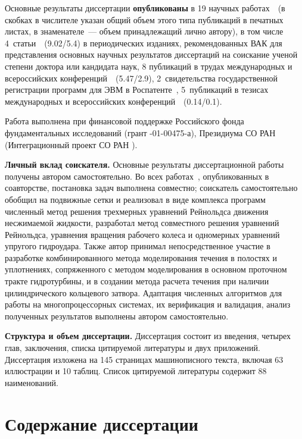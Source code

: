 Основные результаты диссертации \textbf{опубликованы} в 19 научных 
работах~\cite{my1,my1_2,my2,my3,my4,my5,my6,my7,my8,my9,my10,my11,my12,my13,my14,my15,my16,my17,my18}~(в 
скобках в числителе указан общий объем этого типа публикаций в печатных листах, в знаменателе~--- объем 
принадлежащий лично автору), в том числе  4~статьи~\cite{my1,my1_2,my2,my3}~(9.02/5.4) в 
периодических изданиях, рекомендованных ВАК для представления основных научных результатов диссертаций на 
соискание ученой степени доктора или кандидата наук, 8 публикаций в трудах международных и всероссийских
конференций~\cite{my4,my5,my6,my7,my8,my9,my10,my11}~(5.47/2.9), 2~свидетельства государственной 
регистрации программ для ЭВМ в Роспатенте~\cite{my12,my13}, 5~публикаций в тезисах международных и 
всероссийских конференций~\cite{my14,my15,my16,my17,my18}~(0.14/0.1).

Работа выполнена при финансовой поддержке Российского фонда фундаментальных исследований 
(грант -01-00475-а), Президиума СО РАН (Интеграционный проект СО РАН ).

\textbf{Личный вклад соискателя.} Основные результаты диссертационной работы получены автором 
самостоятельно. Во всех работах~\cite{my1,my1_2,my2,my3,my4,my5,my6,my8,my9,my10,my11,my12,my13,my14,my16}, 
опубликованных в соавторстве, постановка задач выполнена совместно;
соискатель самостоятельно обобщил на подвижные сетки и реализовал в виде комплекса программ 
численный метод решения трехмерных уравнений Рейнольдса движения несжимаемой жидкости, 
разработал метод совместного решения уравнений Рейнольдса, уравнения вращения рабочего колеса 
и одномерных уравнений упругого гидроудара. Также автор 
принимал непосредственное участие в разработке комбинированного метода моделирования течения в полостях и 
уплотнениях, сопряженного с методом моделирования в основном проточном тракте гидротурбины, и в создании 
метода расчета течения при наличии цилиндрического кольцевого затвора. 
Адаптация численных алгоритмов для работы на многопроцессорных системах, их верификация и валидация, анализ 
полученных результатов выполнены автором самостоятельно. 

\textbf{Структура и объем диссертации.}
Диссертация состоит из введения, четырех глав, заключения, списка цитируемой литературы 
и двух приложений. Диссертация изложена на 145 страницах машинописного 
текста, включая 63 иллюстрации и 10 таблиц. Список цитируемой литературы 
содержит 88 наименований.

\section*{Содержание диссертации}

